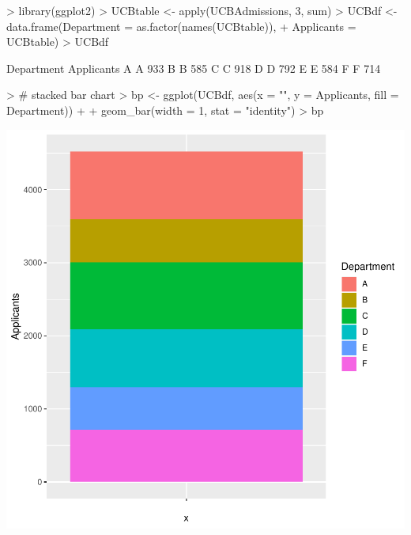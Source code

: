 \documentclass[12pt,letterpaper,final]{article}
\begin{document}
\begin{Schunk}
\begin{Sinput}
> library(ggplot2)
> UCBtable <- apply(UCBAdmissions, 3, sum)
> UCBdf <- data.frame(Department = as.factor(names(UCBtable)),
+                     Applicants = UCBtable)
> UCBdf
\end{Sinput}
\begin{Soutput}
  Department Applicants
A          A        933
B          B        585
C          C        918
D          D        792
E          E        584
F          F        714
\end{Soutput}
\begin{Sinput}
> # stacked bar chart
> bp <- ggplot(UCBdf, aes(x = "", y = Applicants, fill = Department)) + 
+   geom_bar(width = 1, stat = "identity")
> bp
\end{Sinput}
\end{Schunk}
\includegraphics{lect_main-008}
\end{document}

